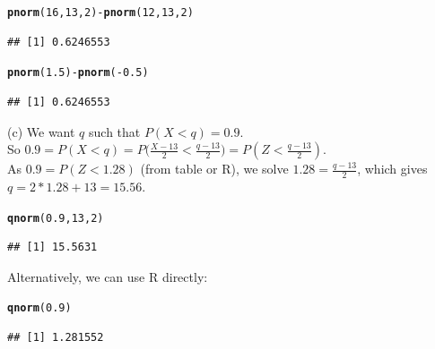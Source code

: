 \documentclass[bigtut]{tutorial}\usepackage[]{graphicx}\usepackage[]{color}
\makeatletter
\newcommand{\hlnum}[1]{\textcolor[rgb]{0.686,0.059,0.569}{#1}}%
\newcommand{\hlopt}[1]{\textcolor[rgb]{0,0,0}{#1}}%
\newcommand{\hlstd}[1]{\textcolor[rgb]{0.345,0.345,0.345}{#1}}%
\newcommand{\hlkwd}[1]{\textcolor[rgb]{0.737,0.353,0.396}{\textbf{#1}}}%
\newenvironment{kframe}{%
 \def\at@end@of@kframe{}%
 \ifinner\ifhmode%
  \def\at@end@of@kframe{\end{minipage}}%
  \begin{minipage}{\columnwidth}%
 \fi\fi%
 \def\FrameCommand##1{\hskip\@totalleftmargin \hskip-\fboxsep
 \colorbox{shadecolor}{##1}\hskip-\fboxsep
     \hskip-\linewidth \hskip-\@totalleftmargin \hskip\columnwidth}%
 \MakeFramed {\advance\hsize-\width
   \@totalleftmargin\z@ \linewidth\hsize
   \@setminipage}}%
 {\par\unskip\endMakeFramed%
 \at@end@of@kframe}
\newenvironment{knitrout}{}{} %
\makeatother
\begin{document}
\begin{tutorial}
\begin{questions}
\begin{solution}
\begin{knitrout}
\color{fgcolor}\begin{kframe}
\begin{alltt}
\hlkwd{pnorm}\hlstd{(}\hlnum{16}\hlstd{,}\hlnum{13}\hlstd{,}\hlnum{2}\hlstd{)} \hlopt{-} \hlkwd{pnorm}\hlstd{(}\hlnum{12}\hlstd{,}\hlnum{13}\hlstd{,}\hlnum{2}\hlstd{)}
\end{alltt}
\begin{verbatim}
## [1] 0.6246553
\end{verbatim}
\begin{alltt}
\hlkwd{pnorm}\hlstd{(}\hlnum{1.5}\hlstd{)}\hlopt{-}\hlkwd{pnorm}\hlstd{(}\hlopt{-}\hlnum{0.5}\hlstd{)}
\end{alltt}
\begin{verbatim}
## [1] 0.6246553
\end{verbatim}
\end{kframe}
\end{knitrout}

\vspace{.5cm}
(c) We want $q$ such that $P(X < q) = 0.9$. \\
So $0.9 = P(X < q) = P \big(\frac{X-13}{2}  < \frac{q-13}{2} \big) = P(Z < \frac{q-13}{2})$. \\
As $0.9 = P(Z < 1.28)$ (from table or R), we solve $1.28 = \frac{q-13}{2}$, which gives $q = 2*1.28 + 13 = 15.56$.

\begin{knitrout}
\color{fgcolor}\begin{kframe}
\begin{alltt}
\hlkwd{qnorm}\hlstd{(}\hlnum{0.9}\hlstd{,}\hlnum{13}\hlstd{,}\hlnum{2}\hlstd{)}
\end{alltt}
\begin{verbatim}
## [1] 15.5631
\end{verbatim}
\end{kframe}
\end{knitrout}

\vspace{.5cm}
Alternatively, we can use R directly:
\begin{knitrout}
\color{fgcolor}\begin{kframe}
\begin{alltt}
\hlkwd{qnorm}\hlstd{(}\hlnum{0.9}\hlstd{)}
\end{alltt}
\begin{verbatim}
## [1] 1.281552
\end{verbatim}
\end{kframe}
\end{knitrout}



\end{solution}
\end{questions}
\end{tutorial}
\end{document}
